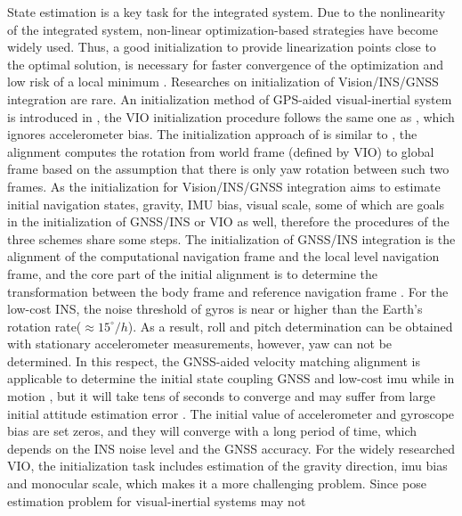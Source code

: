 \documentclass[journal,article,submit,moreauthors,pdftex]{Definitions/mdpi}
\begin{document}
State estimation is a key task for the integrated system.
Due to the nonlinearity of the integrated system, non-linear 
optimization-based strategies have become widely used.
Thus, a good initialization to provide linearization points close to 
the optimal solution, is necessary for faster convergence of the 
optimization and low risk of a local minimum 
\cite{harsanyiMASATFastRobust2019}. 
Researches on initialization of Vision/INS/GNSS integration
are rare.
An initialization method of GPS-aided visual-inertial system is 
introduced in \cite{yuGPSaidedOmnidirectionalVisualInertial2019}, 
the VIO initialization procedure follows the same one as \cite{qinRobustInitializationMonocular2017}, 
which ignores accelerometer bias. 
The initialization approach of \cite{leeIntermittentGPSaidedVIO} is 
similar to \cite{yuGPSaidedOmnidirectionalVisualInertial2019}, 
the alignment computes the rotation from world frame (defined 
by VIO) to global frame based on the assumption that there is only 
yaw rotation between such two frames. 
As the initialization for Vision/INS/GNSS integration aims to 
estimate initial navigation states, gravity, IMU bias, visual 
scale, some of which are goals in the initialization of GNSS/INS or 
VIO as well, therefore the procedures of the three schemes share 
some steps.
The initialization of GNSS/INS integration is the alignment of the 
computational navigation frame and the local level navigation frame, 
and the core part of the initial alignment is to determine the 
transformation between the body frame and reference navigation frame 
\cite{huangNewFastInMotion2018}. 
For the low-cost INS, the noise threshold of gyros is near or higher 
than the Earth’s rotation rate($\approx{15^{\circ}/h}$). 
As a result, roll and pitch determination can be obtained with 
stationary accelerometer measurements, however, yaw can not be 
determined. 
In this respect, the GNSS-aided velocity matching alignment is 
applicable to determine the initial state coupling GNSS and low-cost 
imu while in motion \cite{shinAccuracyImprovementLow}, but it will 
take tens of seconds to converge and may suffer from large initial 
attitude estimation error \cite{huangNewFastInMotion2018}. 
The initial value of  accelerometer and gyroscope bias are set zeros, 
and they will converge with a long period of time, which depends on 
the INS noise level and the GNSS accuracy. 
For the widely researched VIO, the initialization task includes 
estimation of the gravity direction, imu bias and monocular scale, 
which makes it a more challenging problem. 
Since pose estimation problem for visual-inertial systems may not 
\end{document}
